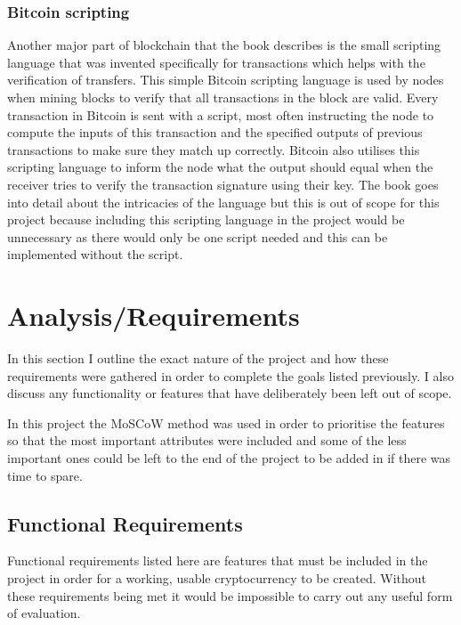 \documentclass{l4proj}
\begin{document}
\subsection{Bitcoin scripting}
Another major part of blockchain that the book describes is the small scripting language that was invented specifically for
transactions which helps with the verification of transfers. This simple Bitcoin scripting language is used
by nodes when mining blocks to verify that all transactions in the block are valid. Every transaction in Bitcoin is
sent with a script, most often instructing the node to compute the inputs of this transaction and the specified outputs of
previous transactions to make sure they match up correctly. Bitcoin also utilises this scripting language to inform the node
what the output should equal when the receiver tries to verify the transaction signature using their key. The book goes
into detail about the intricacies of the language but this is out of scope for this project because including this scripting language
in the project would be unnecessary as there would only be one script needed and this can be implemented without the script.


\chapter{Analysis/Requirements}
In this section I outline the exact nature of the project and how these requirements were gathered in order to 
complete the goals listed previously. I also discuss any functionality or features that have deliberately been
left out of scope.

In this project the MoSCoW method \citep{moscow} was used in order to prioritise the features so that the most important attributes
were included and some of the less important ones could be left to the end of the project to be added in if there was
time to spare.


\section{Functional Requirements}
Functional requirements listed here are features that must be included in the project in order for a working,
usable cryptocurrency to be created. Without these requirements being met it would be impossible to carry out any
useful form of evaluation.
\end{document}
